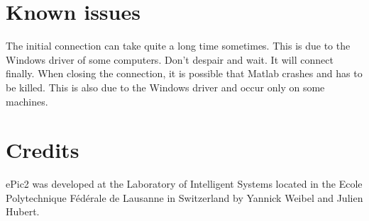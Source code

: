 \documentclass[11pt,oneside,english,a4paper]{article}
\begin{document}
\section{Known issues}
The initial connection can take quite a long time sometimes. This is due to the Windows driver of some computers. Don't despair and wait. It will connect finally. When closing the connection, it is possible that Matlab crashes and has to be killed. This is also due to the Windows driver and occur only on some machines.

\section{Credits}
ePic2 was developed at the Laboratory of Intelligent Systems located in the Ecole Polytechnique F\'ed\'erale de Lausanne in Switzerland by Yannick Weibel and Julien Hubert.
\end{document}

